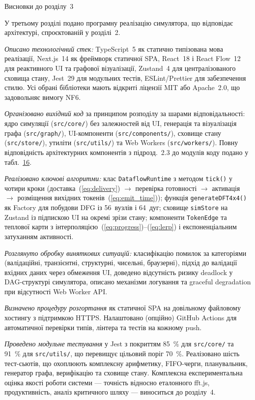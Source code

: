 \protect{}\label{_Toc229681163}{}Висновки до розділу~3

У третьому розділі подано програмну реалізацію симулятора, що відповідає
архітектурі, спроєктованій у розділі~2.

\emph{Описано технологічний стек:} TypeScript~5 як статично типізована
мова реалізації, Next.js~14 як фреймворк статичної SPA, React~18 і React
Flow~12 для реактивного UI та графової візуалізації, Zustand~4 для
централізованого сховища стану, Jest~29 для модульних тестів,
ESLint/Prettier для забезпечення стилю. Усі обрані бібліотеки мають
відкриті ліцензії MIT або Apache~2.0, що задовольняє вимогу NF6.

\emph{Організовано вихідний код} за принципом розподілу за шарами
відповідальності: ядро симуляції (\texttt{src/core/}) без залежностей
від UI, генерація та візуалізація графа (\texttt{src/graph/}),
UI-компоненти (\texttt{src/components/}), сховище стану
(\texttt{src/store/}), утиліти (\texttt{src/utils/}) та Web Workers
(\texttt{src/workers/}). Повну відповідність архітектурних компонентів з
підрозд.~2.3 до модулів коду подано у
табл.~\hyperref[tab:arch_to_code]{16}.

\emph{Реалізовано ключові алгоритми:} клас \texttt{DataflowRuntime} з
методом \texttt{tick()} у чотири кроки
(доставка~(\hyperref[eq:delivery]{{[}eq:delivery{]}}) \(\rightarrow\)
перевірка готовності \(\rightarrow\) активація \(\rightarrow\)
розміщення вихідних
токенів~(\hyperref[eq:emit_time]{{[}eq:emit\_time{]}})); функція
\texttt{generateDFT4x4()} як Factory для побудови DFG із 56~вузлів і
64~дуг; сховище \texttt{simStore} на Zustand із підпискою UI на окремі
зрізи стану; компоненти \texttt{TokenEdge} та теплової карти з
інтерполяцією~(\hyperref[eq:progress]{{[}eq:progress{]}})--(\hyperref[eq:lerp]{{[}eq:lerp{]}})
і експоненціальним затуханням активності.

\emph{Розглянуто обробку виняткових ситуацій:} класифікацію помилок за
категоріями (валідаційні, транзієнтні, структурні, чисельні, браузерні),
підхід до валідації вхідних даних через обмеження UI, доведено
відсутність ризику deadlock у DAG-структурі симулятора, описано
механізми логування та graceful degradation при відсутності Web Worker
API.

\emph{Визначено процедуру розгортання} як статичної SPA на довільному
файловому хостингу з підтримкою HTTPS. Налаштовано (опційно) GitHub
Actions для автоматичної перевірки типів, лінтера та тестів на кожному
push.

\emph{Проведено модульне тестування} у Jest з покриттям 85~\% для
\texttt{src/core/} та 91~\% для \texttt{src/utils/}, що перевищує
цільовий поріг 70~\%. Реалізовано шість тест-сьютів, що охоплюють
комплексну арифметику, FIFO-черги, планувальник, генератор графа,
верифікацію та сховище стану. Комплексна експериментальна оцінка якості
роботи системи --- точність відносно еталонного fft.js, продуктивність,
аналіз критичного шляху --- виноситься до розділу~4.

